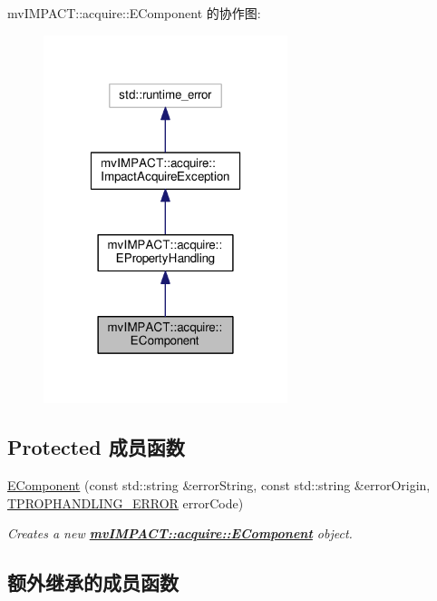 mv\+I\+M\+P\+A\+C\+T\+:\+:acquire\+:\+:E\+Component 的协作图\+:
\nopagebreak
\begin{figure}[H]
\begin{center}
\leavevmode
\includegraphics[width=202pt]{classmv_i_m_p_a_c_t_1_1acquire_1_1_e_component__coll__graph}
\end{center}
\end{figure}
\subsection*{Protected 成员函数}
\begin{DoxyCompactItemize}
\item 
\hyperlink{classmv_i_m_p_a_c_t_1_1acquire_1_1_e_component_a8433abc1b10332559104bc14136c09b2}{E\+Component} (const std\+::string \&error\+String, const std\+::string \&error\+Origin, \hyperlink{group___common_interface_ga61b0634ab285d9a2a303e0092167127e}{T\+P\+R\+O\+P\+H\+A\+N\+D\+L\+I\+N\+G\+\_\+\+E\+R\+R\+O\+R} error\+Code)
\begin{DoxyCompactList}\small\item\em Creates a new {\bfseries \hyperlink{classmv_i_m_p_a_c_t_1_1acquire_1_1_e_component}{mv\+I\+M\+P\+A\+C\+T\+::acquire\+::\+E\+Component}} object. \end{DoxyCompactList}\end{DoxyCompactItemize}
\subsection*{额外继承的成员函数}


